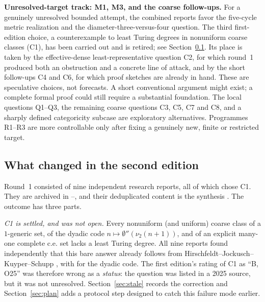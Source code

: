 \documentclass[11pt,a4paper]{article}
\theoremstyle{definition}\newtheorem{definition}[theorem]{Definition}
\theoremstyle{remark}\newtheorem{remark}[theorem]{Remark}
\begin{document}
\textbf{Unresolved-target track: M1, M3, and the coarse follow-ups.} For a genuinely unresolved bounded attempt, the combined reports favor the five-cycle metric realization and the diameter-three-versus-four question. The third first-edition choice, a counterexample to least Turing degrees in nonuniform coarse classes (C1), has been carried out and is retired; see Section~\ref{sec:changes}. Its place is taken by the effective-dense least-representative question C2, for which round~1 produced both an obstruction and a concrete line of attack, and by the short follow-ups C4 and C6, for which proof sketches are already in hand. These are speculative choices, not forecasts. A short conventional argument might exist; a complete formal proof could still require a substantial foundation. The local questions Q1--Q3, the remaining coarse questions C3, C5, C7 and C8, and a sharply defined categoricity subcase are exploratory alternatives. Programmes R1--R3 are more controllable only after fixing a genuinely new, finite or restricted target.

\subsection{What changed in the second edition}
\label{sec:changes}
Round~1 consisted of nine independent research reports, all of which chose C1. They are archived in --, and their deduplicated content is the synthesis \cite{Synthesis}. The outcome has three parts.

\emph{C1 is settled, and was not open.} Every nonuniform (and uniform) coarse class of a $1$-generic set, of the dyadic code $n\mapsto\emptyset''(\nu_2(n+1))$, and of an explicit many-one complete c.e. set lacks a least Turing degree. All nine reports found independently that this bare answer already follows from Hirschfeldt--Jockusch--Kuyper--Schupp \cite[Theorems 4.2 and 4.3]{HJKS}, with \cite[Theorem 2.19]{JS} for the dyadic code. The first edition's rating of C1 as ``B, O25'' was therefore wrong as a \emph{status}: the question was listed in a 2025 source, but it was not unresolved. Section~\ref{sec:stale} records the correction and Section~\ref{sec:plan} adds a protocol step designed to catch this failure mode earlier.
\end{document}
